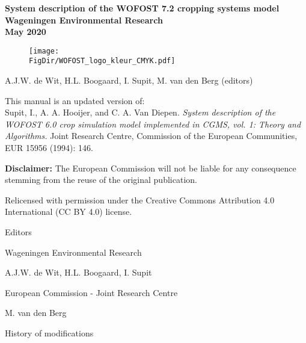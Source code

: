\documentclass[a4paper,12pt,oneside]{book}
\newcommand{\FigDir}{D:/UserData/sources/WOFOST_system_docs/latex/figs}
\begin{document}

\frontmatter
\begin{titlepage}
	\centering
	\vfill
	{\bfseries
		{\LARGE
		System description of the WOFOST 7.2 cropping systems model}\\
		\vskip0.5cm
		{\large
			Wageningen Environmental Research\\ 
   	        \vskip0.5cm
			May 2020}\\

		\begin{figure}[h]
		\texttt{[image: \\FigDir/WOFOST\_logo\_kleur\_CMYK.pdf]}
	    \end{figure}
		\vskip1cm

		{\large A.J.W. de Wit, H.L. Boogaard, I. Supit, M. van den Berg (editors)}\\
		\vskip0.5cm
     }
     {\small 

	This manual is an updated version of:\\
    Supit, I., A. A. Hooijer, and C. A. Van Diepen. 
	\textit{System description of the WOFOST 6.0 crop simulation model implemented in CGMS, vol. 1: 
    Theory and Algorithms.} Joint Research Centre, Commission of the European Communities, EUR 15956 
             (1994): 146.
             
    \textbf{Disclaimer:} The European Commission will not be liable for any consequence stemming from the reuse of the
     original publication.
     
    Relicensed with permission under the Creative Commons Attribution 4.0 International (CC BY 4.0) license.
    }
\end{titlepage}

\thispagestyle{empty}
{\Huge Editors}

\vspace{2cm}
{\Large Wageningen Environmental Research}

A.J.W. de Wit, H.L. Boogaard, I. Supit

\vspace{1cm}
{\Large European Commission - Joint Research Centre}

M. van den Berg

\vspace{3cm}
{\Huge History of modifications}
\begin{versionhistory}
\end{versionhistory}

\newpage

\tableofcontents
\listoffigures
\listoftables
\cleardoublepage

\mainmatter







\backmatter
\appendix



\end{document}
